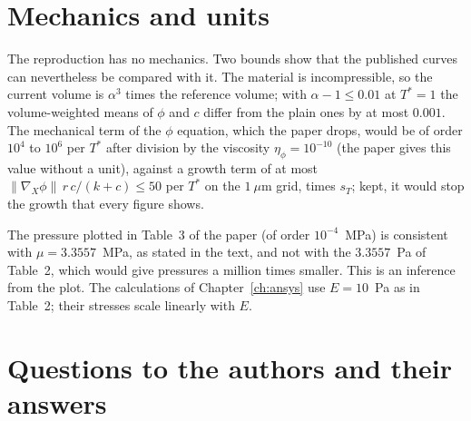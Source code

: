\section{Mechanics and units}

The reproduction has no mechanics. Two bounds show that the published curves
can nevertheless be compared with it. The material is incompressible, so the
current volume is $\alpha^3$ times the reference volume; with
$\alpha-1\le0.01$ at $T^*=1$ the volume-weighted means of $\phi$ and $c$
differ from the plain ones by at most $0.001$. The mechanical term of the
$\phi$ equation, which the paper drops, would be of order $10^4$ to $10^6$
per $T^*$ after division by the viscosity $\eta_\phi=10^{-10}$ (the paper gives this value without a unit), against a
growth term of at most $\|\nabla_X\phi\|\,r\,c/(k+c)\le50$ per $T^*$ on the $1~\mu$m grid, times $s_T$; kept, it would stop the growth that
every figure shows.

The pressure plotted in Table~3 of the paper (of order $10^{-4}$~MPa) is
consistent with $\mu=3.3557$~MPa, as stated in the text, and not with the
$3.3557$~Pa of Table~2, which would give pressures a million times smaller.
This is an inference from the plot. The calculations of
Chapter~\ref{ch:ansys} use $E=10$~Pa as in Table~2; their stresses scale
linearly with $E$.

\section{Questions to the authors and their answers}

